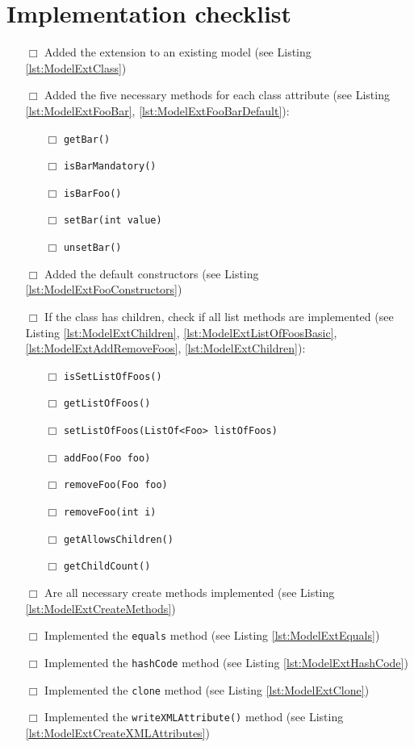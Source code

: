 \section{Implementation checklist}
    \begin{itemize}
        \item [$\Box$] Added the extension to an existing model (see Listing \ref{lst:ModelExtClass})
        \item [$\Box$] Added the five necessary methods for each class attribute (see Listing \ref{lst:ModelExtFooBar}, \ref{lst:ModelExtFooBarDefault}):
            \begin{itemize}
              \item [$\Box$] \texttt{getBar()}
              \item [$\Box$] \texttt{isBarMandatory()}
              \item [$\Box$] \texttt{isBarFoo()}
              \item [$\Box$] \texttt{setBar(int value)}
              \item [$\Box$] \texttt{unsetBar()}
            \end{itemize}
        \item [$\Box$] Added the default constructors (see Listing \ref{lst:ModelExtFooConstructors})
        \item [$\Box$] If the class has children, check if all list methods are implemented (see Listing \ref{lst:ModelExtChildren}, \ref{lst:ModelExtListOfFoosBasic}, \ref{lst:ModelExtAddRemoveFoos}, \ref{lst:ModelExtChildren}):
            \begin{itemize}
              \item [$\Box$] \texttt{isSetListOfFoos()}
              \item [$\Box$] \texttt{getListOfFoos()}
              \item [$\Box$] \texttt{setListOfFoos(ListOf<Foo> listOfFoos)}
              \item [$\Box$] \texttt{addFoo(Foo foo)}
              \item [$\Box$] \texttt{removeFoo(Foo foo)}
              \item [$\Box$] \texttt{removeFoo(int i)}
              \item [$\Box$] \texttt{getAllowsChildren()}
              \item [$\Box$] \texttt{getChildCount()}
            \end{itemize}
        \item [$\Box$] Are all necessary create methods implemented (see Listing \ref{lst:ModelExtCreateMethods})
        \item [$\Box$] Implemented the \texttt{equals} method (see Listing \ref{lst:ModelExtEquals})
        \item [$\Box$] Implemented the \texttt{hashCode} method (see Listing \ref{lst:ModelExtHashCode})
        \item [$\Box$] Implemented the \texttt{clone} method (see Listing \ref{lst:ModelExtClone})
        \item [$\Box$] Implemented the \texttt{writeXMLAttribute()} method (see Listing \ref{lst:ModelExtCreateXMLAttributes})
   \end{itemize}
